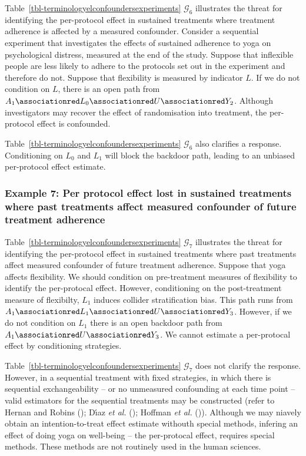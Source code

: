 \documentclass[
  single column]{article}
\begin{document}
Table~\ref{tbl-terminologyelconfoundersexperiments} \(\mathcal{G}_{6}\)
illustrates the threat for identifying the per-protocol effect in
sustained treatments where treatment adherence is affected by a measured
confounder. Consider a sequential experiment that investigates the
effects of sustained adherence to yoga on psychological distress,
measured at the end of the study. Suppose that inflexible people are
less likely to adhere to the protocols set out in the experiment and
therefore do not. Suppose that flexibility is measured by indicator
\(L\). If we do not condition on \(L\), there is an open path from
\(A_1 \associationred L_0 \associationred U \associationred Y_2\).
Although investigators may recover the effect of randomisation into
treatment, the per-protocol effect is confounded.

Table~\ref{tbl-terminologyelconfoundersexperiments} \(\mathcal{G}_{6}\)
also clarifies a response. Conditioning on \(L_0\) and \(L_1\) will
block the backdoor path, leading to an unbiased per-protocol effect
estimate.

\subsubsection{Example 7: Per protocol effect lost in sustained
treatments where past treatments affect measured confounder of future
treatment
adherence}\label{example-7-per-protocol-effect-lost-in-sustained-treatments-where-past-treatments-affect-measured-confounder-of-future-treatment-adherence}

Table~\ref{tbl-terminologyelconfoundersexperiments} \(\mathcal{G}_{7}\)
illustrates the threat for identifying the per-protocol effect in
sustained treatments where past treatments affect measured confounder of
future treatment adherence. Suppose that yoga affects flexibility. We
should condition on pre-treatment measures of flexibility to identify
the per-protocal effect. However, conditioning on the post-treatment
measure of flexibilty, \(\boxed{L_1}\) induces collider stratification
bias. This path runs from
\(A_1 \associationred L_1 \associationred U \associationred Y_3\).
However, if we do not condition on \(L_1\) there is an open backdoor
path from \(A_1 \associationred U \associationred Y_3\). We cannot
estimate a per-protocal effect by conditioning strategies.

Table~\ref{tbl-terminologyelconfoundersexperiments} \(\mathcal{G}_{7}\)
does not clarify the response. However, in a sequential treatment with
fixed strategies, in which there is sequential exchangeability -- or no
unmeasured confounding at each time point -- valid estimators for the
sequential treatments may be constructed (refer to Hernan and Robins
(); Dı́az \emph{et al.}
(); Hoffman \emph{et al.}
()). Although we may niavely obtain an
intention-to-treat effect estimate withouth special methods, infering an
effect of doing yoga on well-being -- the per-protocal effect, requires
special methods. These methods are not routinely used in the human
sciences.
\end{document}
